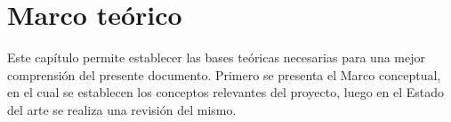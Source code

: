 \chapter{Marco teórico}
Este capítulo permite establecer las bases teóricas necesarias para una mejor comprensión del presente documento. Primero se presenta el Marco conceptual, en el cual se establecen los conceptos relevantes del proyecto, luego en el Estado del arte se realiza una revisión del mismo.